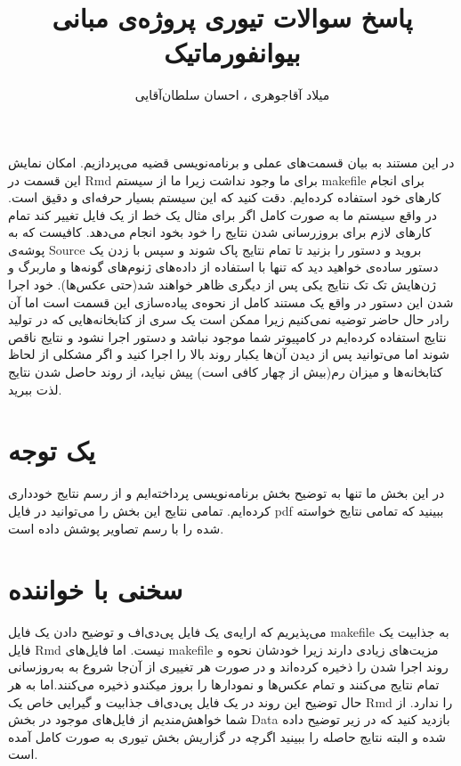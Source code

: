 \documentclass[11pt]{article}
\title{پاسخ سوالات تیوری پروژه‌ی مبانی بیو‌انفورماتیک}
\author{میلاد آقاجوهری ، احسان سلطان‌آقایی}
\begin{document}
\maketitle
در این مستند به بیان قسمت‌‌های عملی و برنامه‌‌نویسی قضیه می‌پردازیم. امکان نمایش این قسمت در Rmd برای ما وجود نداشت زیرا ما از سیستم makefile برای انجام کار‌های خود استفاده کرده‌ایم. دقت کنید که این سیستم بسیار حرفه‌ای و دقیق است. در واقع سیستم ما به صورت کامل اگر برای مثال یک خط از یک فایل تغییر کند تمام کارهای لازم برای بروزرسانی شدن نتایج را خود بخود انجام می‌دهد. کافیست که به پوشه‌ی Source بروید و دستور
را بزنید تا تمام نتایج پاک شوند و سپس با زدن یک دستور ساده‌ی 
خواهید دید که تنها با استفاده از داده‌های ژنوم‌ها‌ی گونه‌ها و ماربرگ و ژن‌هایش تک تک نتایج یکی پس از دیگری ظاهر خواهند شد(حتی عکس‌ها). خود اجرا شدن این دستور در واقع یک مستند کامل از نحوه‌ی پیاده‌سازی این قسمت است اما آن رادر حال حاضر توضیه نمی‌کنیم زیرا ممکن است یک سری از کتابخانه‌هایی که در تولید نتایج استفاده کرده‌ایم در کامپیوتر شما موجود نباشد و دستور اجرا نشود و نتایج ناقص شوند اما می‌توانید پس از دیدن آن‌ها یکبار روند بالا را اجرا کنید و اگر مشکلی از لحاظ کتابخانه‌ها و میزان رم(بیش از چهار کافی است) پیش نیاید، از روند حاصل شدن نتایج لذت ببرید.
\section{یک توجه}
در این بخش ما تنها به توضیح بخش برنامه‌نویسی پرداخته‌ایم و از رسم نتایج خود‌داری کرده‌ایم. تمامی نتایج این بخش را می‌توانید در فایل pdf 
ببینید که تمامی نتایج خواسته شده را با رسم تصاویر پوشش داده است.
\section{سخنی با خواننده}
می‌پذیریم که ارایه‌ی یک فایل پی‌دی‌اف و توضیح دادن یک فایل
makefile 
به جذابیت یک فایل Rmd نیست. اما فایل‌های makefile مزیت‌های زیادی دارند زیرا خودشان نحوه و روند اجرا شدن را ذخیره کرده‌اند و در صورت هر تغییری از آن‌جا شروع به به‌روز‌سانی تمام نتایج می‌کنند و تمام عکس‌ها و نمودارها را بروز میکندو ذخیره می‌کنند.اما به هر حال توضیح این روند در یک فایل پی‌دی‌اف جذابیت و گیرایی خاص یک Rmd را ندارد. از شما خواهش‌مندیم از فایل‌های موجود در بخش Data بازدید کنید که در زیر توضیح داده شده و البته نتایج حاصله را ببینید اگرچه در گزاریش بخش تیوری به صورت کامل آمده است.
\end{document}
